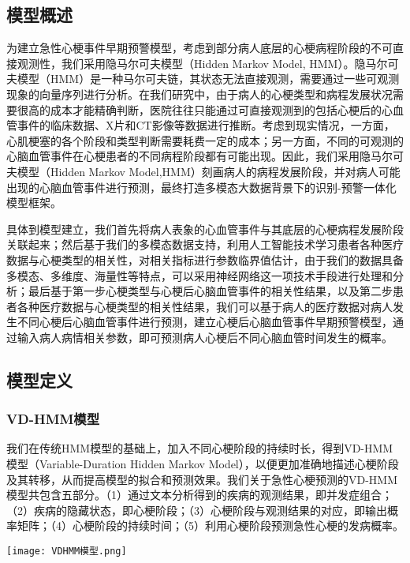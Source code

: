 \documentclass{article}
\begin{document}
\subsection{模型概述}
为建立急性心梗事件早期预警模型，考虑到部分病人底层的心梗病程阶段的不可直接观测性，我们采用隐马尔可夫模型（Hidden Markov Model, HMM）。隐马尔可夫模型（HMM）是一种马尔可夫链，其状态无法直接观测，需要通过一些可观测现象的向量序列进行分析。在我们研究中，由于病人的心梗类型和病程发展状况需要很高的成本才能精确判断，医院往往只能通过可直接观测到的包括心梗后的心血管事件的临床数据、X片和CT影像等数据进行推断。考虑到现实情况，一方面，心肌梗塞的各个阶段和类型判断需要耗费一定的成本；另一方面，不同的可观测的心脑血管事件在心梗患者的不同病程阶段都有可能出现。因此，我们采用隐马尔可夫模型（Hidden Markov Model,HMM）刻画病人的病程发展阶段，并对病人可能出现的心脑血管事件进行预测，最终打造多模态大数据背景下的识别-预警一体化模型框架。
\par 
具体到模型建立，我们首先将病人表象的心血管事件与其底层的心梗病程发展阶段关联起来；然后基于我们的多模态数据支持，利用人工智能技术学习患者各种医疗数据与心梗类型的相关性，对相关指标进行参数临界值估计，由于我们的数据具备多模态、多维度、海量性等特点，可以采用神经网络这一项技术手段进行处理和分析；最后基于第一步心梗类型与心梗后心脑血管事件的相关性结果，以及第二步患者各种医疗数据与心梗类型的相关性结果，我们可以基于病人的医疗数据对病人发生不同心梗后心脑血管事件进行预测，建立心梗后心脑血管事件早期预警模型，通过输入病人病情相关参数，即可预测病人心梗后不同心脑血管时间发生的概率。
\par

\subsection{模型定义}
\subsubsection{VD-HMM模型}
我们在传统HMM模型的基础上，加入不同心梗阶段的持续时长，得到VD-HMM模型（Variable-Duration Hidden Markov Model），以便更加准确地描述心梗阶段及其转移，从而提高模型的拟合和预测效果。我们关于急性心梗预测的VD-HMM 模型共包含五部分。（1）通过文本分析得到的疾病的观测结果，即并发症组合；（2）疾病的隐藏状态，即心梗阶段；（3）心梗阶段与观测结果的对应，即输出概率矩阵；（4）心梗阶段的持续时间；（5）利用心梗阶段预测急性心梗的发病概率。\par

\begin{center}
\texttt{[image: VDHMM模型.png]}\\
\end{center}
\end{document}
